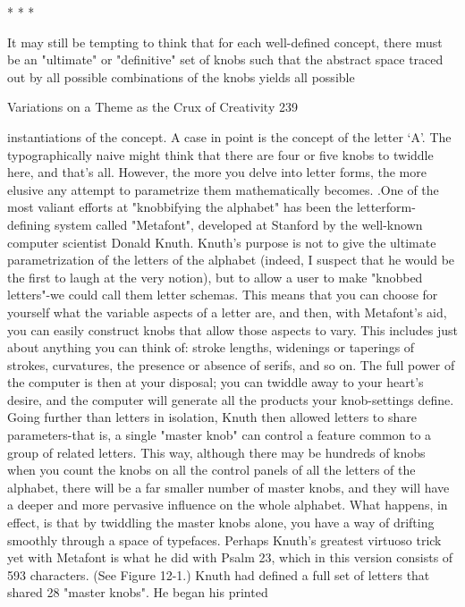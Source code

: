                                         *   *   *

        It may still be tempting to think that for each well-defined concept, there must
be an "ultimate" or "definitive" set of knobs such that the abstract space traced out by
all possible combinations of the knobs yields all possible




Variations on a Theme as the Crux of Creativity                                       239

instantiations of the concept. A case in point is the concept of the letter `A'. The
typographically naive might think that there are four or five knobs to twiddle here,
and that's all. However, the more you delve into letter forms, the more elusive any
attempt to parametrize them mathematically becomes. .One of the most valiant efforts
at "knobbifying the alphabet" has been the letterform-defining system called
"Metafont", developed at Stanford by the well-known computer scientist Donald
Knuth.
         Knuth's purpose is not to give the ultimate parametrization of the letters of the
alphabet (indeed, I suspect that he would be the first to laugh at the very notion), but
to allow a user to make "knobbed letters"-we could call them letter schemas. This
means that you can choose for yourself what the variable aspects of a letter are, and
then, with Metafont's aid, you can easily construct knobs that allow those aspects to
vary. This includes just about anything you can think of: stroke lengths, widenings or
taperings of strokes, curvatures, the presence or absence of serifs, and so on. The full
power of the computer is then at your disposal; you can twiddle away to your heart's
desire, and the computer will generate all the products your knob-settings define.
         Going further than letters in isolation, Knuth then allowed letters to share
parameters-that is, a single "master knob" can control a feature common to a group of
related letters. This way, although there may be hundreds of knobs when you count
the knobs on all the control panels of all the letters of the alphabet, there will be a far
smaller number of master knobs, and they will have a deeper and more pervasive
influence on the whole alphabet. What happens, in effect, is that by twiddling the
master knobs alone, you have a way of drifting smoothly through a space of
typefaces.
         Perhaps Knuth's greatest virtuoso trick yet with Metafont is what he did with
Psalm 23, which in this version consists of 593 characters. (See Figure 12-1.) Knuth
had defined a full set of letters that shared 28 "master knobs". He began his printed
